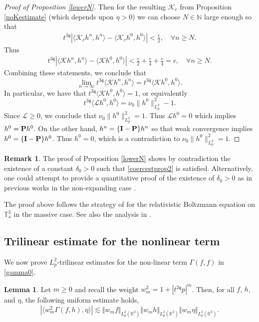 \documentclass[reqno]{amsart}
\newcommand{\pv}{p}
\def\norm#1{\big\Vert#1\big\Vert}
\newcommand{\threed}{{\mathbb R}^3}
\newcommand{\qq}{\mathfrak{q}}
\newcommand{\tqq}{t^{2\qq}}
\newcommand{\tTq}{t^{3\qq}}
\newcommand{\compK}{\mathcal{K}}
\newcommand{\linL}{\mathcal{L}}
\newcommand{\T}{\mathbb{T}}
\theoremstyle{definition}
\newtheorem{lemma}[theorem]{Lemma}
\newtheorem{remark}[theorem]{Remark}
\numberwithin{equation}{section}
\numberwithin{theorem}{section}
\begin{document}
\begin{proof}[Proof of Proposition \ref{lowerN}]
Then for the resulting  ${\compK}_c$ from Proposition \ref{noKestimate} (which depends upon $\eta>0$) we can choose $N \in \mathbb{N}$ large enough so that 
\begin{align*}
   \tTq \left|\langle {\compK}_c h^n, h^n \rangle
-
\langle {\compK}_c h^0, h^0 \rangle \right| 
< \frac{\epsilon}{2}, \quad \forall n \ge N.
\end{align*}
Thus 
\begin{align*}
   \tTq \left|\langle {\compK} h^n, h^n \rangle
-
\langle {\compK} h^0, h^0 \rangle \right| 
< \frac{\epsilon}{2}+\frac{\epsilon}{4}+\frac{\epsilon}{4}=\epsilon, \quad \forall n \ge N.
\end{align*}
Combining these statements, we conclude  that
$$
\lim_{n\to\infty}
\tTq\langle {\compK} h^n, h^n \rangle
=
\tTq\langle {\compK} h^0, h^0 \rangle.
$$
In particular, we have that 
$\tTq\langle {\compK} h^0, h^0 \rangle= 1$,
or equivalently
$$
\tTq\langle {\linL} h^0, h^0 \rangle
=
\nu_0\| h^0 \|_{L^2_p}^2 
- 
1.
$$
Since $\linL\ge 0$, we conclude that $\nu_0\| h^0 \|_{L^2_p}^2  
=
1$.  Thus $\linL h^0= 0$ which implies $h^0 = {\bf P} h^0$.  On the other hand,
 $h^n = \{{\bf I- P}\} h^n$ so that weak convergence implies $h^0 = \{{\bf I- P}\} h^0$.
Thus $h^0 =0$, which is a contradiction to $\nu_0\| h^0 \|_{L^2_p}^2 = 1$. 
\end{proof}

\begin{remark}
    The proof of Proposition \ref{lowerN} shows by contradiction the existence of a constant \(\delta_0>0\) such that \eqref{coercestprop2} is satisfied. Alternatively, one could attempt to provide a quantitative proof of the existence of \(\delta_0>0\) as in previous works in the non-expanding case \cite{MR2322149, BarangerMouhot2005, mouhot2006explicit}.
\end{remark}

The proof above follows the strategy of \cite[Lemma 6.9]{RelBolNoncut2020} for the relativistic Boltzmann equation on \(\T^3_x\) in the massive case. See also the analysis in \cite{MR1211782}. 

\subsection{Trilinear estimate for the nonlinear term}\label{secttrilnonlinear}

We now prove $L^2_p$-trilinear estimates for the non-linear term \(\Gamma(f,f)\) in \eqref{gamma0}.


\begin{lemma}
	\label{thm1} Let \(m\geq 0\) and recall the weight \(w_{m}^2 = 1+|\tqq \pv|^m\). Then, for all \(f\), \(h\), and \(\eta\), the following uniform estimate holds,
	 $$
	 |\langle w_{m}^2 \Gamma(f,h),\eta\rangle| \lesssim \norm{w_{m}f}_{L^2_p(\threed)}\norm{w_{m}h}_{L^2_p(\threed)}\norm{w_{m}\eta}_{L^2_p(\threed)}.
	$$
\end{lemma}
	
\end{document}
